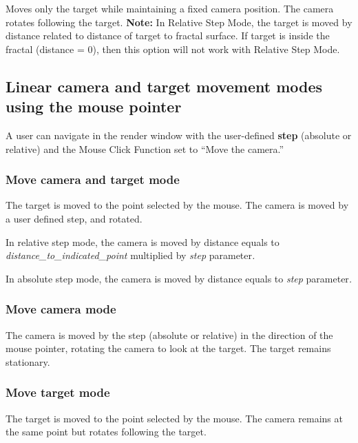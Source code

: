 Moves only the target while maintaining a fixed camera position. The
camera rotates following the target. \textbf{Note:} In Relative Step
Mode, the target is moved by distance related to distance of target to
fractal surface. If target is inside the fractal (distance = 0), then
this option will not work with Relative Step Mode.

\hypertarget{linear-camera-and-target-movement-modes-using-the-mouse-pointer}{\subsection{Linear
camera and target movement modes using the mouse
pointer}\label{linear-camera-and-target-movement-modes-using-the-mouse-pointer}}

A user can navigate in the render window with the user-defined
\textbf{step} (absolute or relative) and the Mouse Click Function set to
``Move the camera.''

\subsubsection{Move camera and target
mode}\label{move-camera-and-target-mode-1}

The target is moved to the point selected by the mouse. The camera is
moved by a user defined step, and rotated.

In relative step mode, the camera is moved by distance equals to
\emph{distance\_to\_indicated\_point} multiplied by \emph{step}
parameter\emph{.}

In absolute step mode, the camera is moved by distance equals to
\emph{step} parameter\emph{.}

\subsubsection{Move camera mode}\label{move-camera-mode-1}

The camera is moved by the step (absolute or relative) in the direction
of the mouse pointer, rotating the camera to look at the target. The
target remains stationary.

\subsubsection{Move target mode}\label{move-target-mode-1}

The target is moved to the point selected by the mouse. The camera
remains at the same point but rotates following the target.

